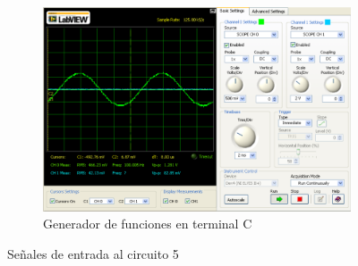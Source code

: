 \documentclass[]{article}
\begin{document}
\begin{figure}[h!]
\begin{subfigure}[b]{0.45\textwidth}
		\includegraphics[width=\textwidth]{Imagenes/circuito5generadorVC.png}
		\caption{Generador de funciones en terminal C}
		\label{fig:circuito5generadorVC}
	\end{subfigure}
	\caption{Señales de entrada al circuito 5}\label{fig:circuito5InputSignals}
	
\end{figure}
\end{document}
